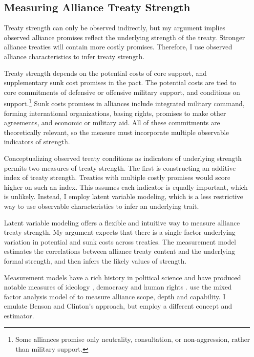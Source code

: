 \documentclass[12pt]{article}
\begin{document}
\subsection{Measuring Alliance Treaty Strength} 


Treaty strength can only be observed indirectly, but my argument implies observed alliance promises reflect the underlying strength of the treaty. 
Stronger alliance treaties will contain more costly promises. 
Therefore, I use observed alliance characteristics to infer treaty strength.


Treaty strength depends on the potential costs of core support, and supplementary sunk cost promises in the pact. 
The potential costs are tied to core commitments of defensive or offensive military support, and conditions on support.\footnote{Some alliances promise only neutrality, consultation, or non-aggression, rather than military support.}  
Sunk costs promises in alliances include integrated military command, forming international organizations, basing rights, promises to make other agreements, and economic or military aid. 
All of these commitments are theoretically relevant, so the measure must incorporate multiple observable indicators of strength. 


Conceptualizing observed treaty conditions as indicators of underlying strength permits two measures of treaty strength. 
The first is constructing an additive index of treaty strength. 
Treaties with multiple costly promises would score higher on such an index. 
This assumes each indicator is equally important, which is unlikely. 
Instead, I employ latent variable modeling, which is a less restrictive way to use observable characteristics to infer an underlying trait. 


Latent variable modeling offers a flexible and intuitive way to measure alliance treaty strength. 
My argument expects that there is a single factor underlying variation in potential and sunk costs across treaties.  
The measurement model estimates the correlations between alliance treaty content and the underlying formal strength, and then infers the likely values of strength. 


Measurement models have a rich history in political science and have produced notable measures of ideology \citep{Clintonetal2004}, democracy \citep{TreierJackman2008} and human rights \citep{Fariss2014}. 
\citet{BensonClinton2016} use the mixed factor analysis model of \citet{Quinn2004} to measure alliance scope, depth and capability.
I emulate Benson and Clinton's approach, but employ a different concept and estimator. 
\end{document}
